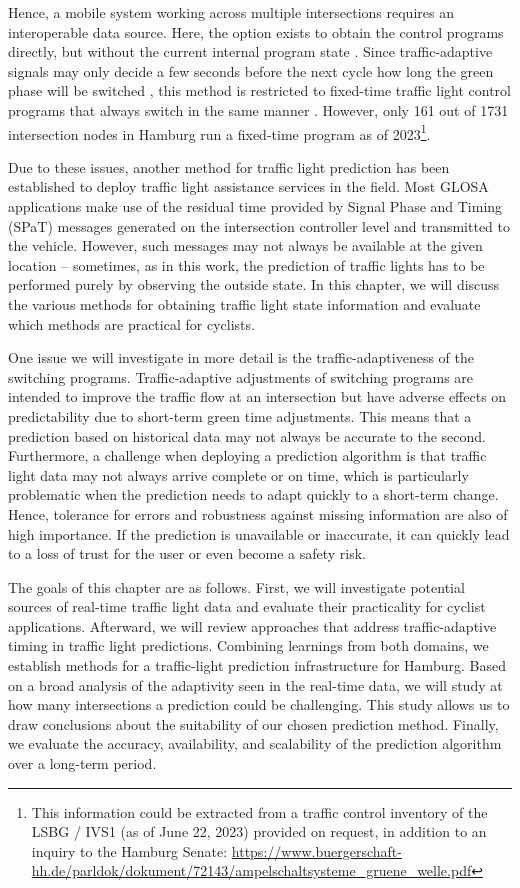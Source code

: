 Hence, a mobile system working across multiple intersections requires an interoperable data source. Here, the option exists to obtain the control programs directly, but without the current internal program state \cite{zweck_traffic_2013}. Since traffic-adaptive signals may only decide a few seconds before the next cycle how long the green phase will be switched \cite{islam_improved_2016}, this method is restricted to fixed-time traffic light control programs that always switch in the same manner \cite{zweck_traffic_2013}. However, only 161 out of 1731 intersection nodes in Hamburg run a fixed-time program as of 2023\footnote{This information could be extracted from a traffic control inventory of the LSBG / IVS1 (as of June 22, 2023) provided on request, in addition to an inquiry to the Hamburg Senate: \url{https://www.buergerschaft-hh.de/parldok/dokument/72143/ampelschaltsysteme_gruene_welle.pdf}}.

Due to these issues, another method for traffic light prediction has been established to deploy traffic light assistance services in the field. Most GLOSA applications make use of the residual time provided by Signal Phase and Timing (SPaT) messages generated on the intersection controller level and transmitted to the vehicle. However, such messages may not always be available at the given location -- sometimes, as in this work, the prediction of traffic lights has to be performed purely by observing the outside state. In this chapter, we will discuss the various methods for obtaining traffic light state information and evaluate which methods are practical for cyclists.

One issue we will investigate in more detail is the traffic-adaptiveness of the switching programs. Traffic-adaptive adjustments of switching programs are intended to improve the traffic flow at an intersection but have adverse effects on predictability due to short-term green time adjustments. This means that a prediction based on historical data may not always be accurate to the second. Furthermore, a challenge when deploying a prediction algorithm is that traffic light data may not always arrive complete or on time, which is particularly problematic when the prediction needs to adapt quickly to a short-term change. Hence, tolerance for errors and robustness against missing information are also of high importance. If the prediction is unavailable or inaccurate, it can quickly lead to a loss of trust for the user or even become a safety risk.

The goals of this chapter are as follows. First, we will investigate potential sources of real-time traffic light data and evaluate their practicality for cyclist applications. Afterward, we will review approaches that address traffic-adaptive timing in traffic light predictions. Combining learnings from both domains, we establish methods for a traffic-light prediction infrastructure for Hamburg. Based on a broad analysis of the adaptivity seen in the real-time data, we will study at how many intersections a prediction could be challenging. This study allows us to draw conclusions about the suitability of our chosen prediction method. Finally, we evaluate the accuracy, availability, and scalability of the prediction algorithm over a long-term period.

